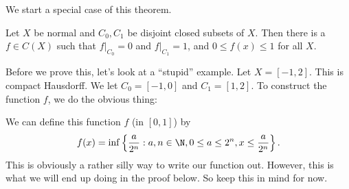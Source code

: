 \documentclass[a4paper]{article}
\begin{document}
We start a special case of this theorem.
\begin{lemma}
  Let $X$ be normal and $C_0, C_1$ be disjoint closed subsets of $X$. Then there is a $f \in C(X)$ such that $f|_{C_0} = 0$ and $f|_{C_1} = 1$, and $0 \leq f(x) \leq 1$ for all $X$.
\end{lemma}
Before we prove this, let's look at a ``stupid'' example. Let $X = [-1, 2]$. This is compact Hausdorff. We let $C_0 = [-1, 0]$ and $C_1 = [1, 2]$. To construct the function $f$, we do the obvious thing:
\begin{center}
\end{center}
We can define this function $f$ (in $[0, 1]$) by
\[
  f(x) = \inf\left\{\frac{a}{2^n}: a, n \in \N, 0 \leq a \leq 2^n, x \leq \frac{a}{2^n}\right\}.
\]
This is obviously a rather silly way to write our function out. However, this is what we will end up doing in the proof below. So keep this in mind for now.
\end{document}
